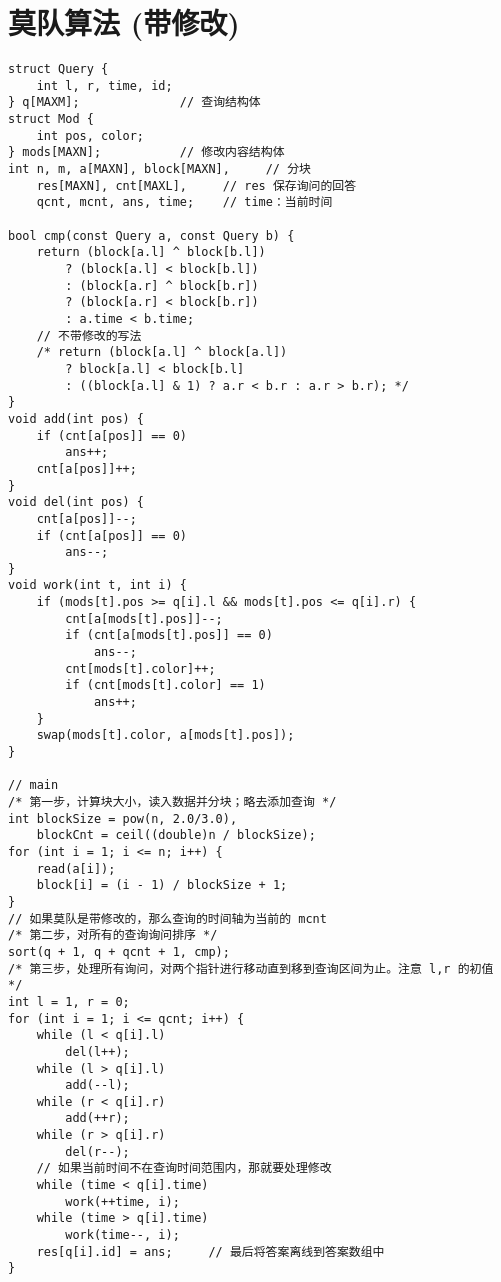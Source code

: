 \section{莫队算法 (带修改)}
\begin{verbatim}
struct Query {
    int l, r, time, id;
} q[MAXM];              // 查询结构体
struct Mod {
    int pos, color;
} mods[MAXN];           // 修改内容结构体
int n, m, a[MAXN], block[MAXN],     // 分块
    res[MAXN], cnt[MAXL],     // res 保存询问的回答
    qcnt, mcnt, ans, time;    // time：当前时间

bool cmp(const Query a, const Query b) {
    return (block[a.l] ^ block[b.l])
        ? (block[a.l] < block[b.l])
        : (block[a.r] ^ block[b.r])
        ? (block[a.r] < block[b.r])
        : a.time < b.time;
    // 不带修改的写法
    /* return (block[a.l] ^ block[a.l])
        ? block[a.l] < block[b.l]
        : ((block[a.l] & 1) ? a.r < b.r : a.r > b.r); */    
}
void add(int pos) {
    if (cnt[a[pos]] == 0)
        ans++;
    cnt[a[pos]]++;
}
void del(int pos) {
    cnt[a[pos]]--;
    if (cnt[a[pos]] == 0)
        ans--;
}
void work(int t, int i) {
    if (mods[t].pos >= q[i].l && mods[t].pos <= q[i].r) {
        cnt[a[mods[t].pos]]--;
        if (cnt[a[mods[t].pos]] == 0)
            ans--;
        cnt[mods[t].color]++;
        if (cnt[mods[t].color] == 1)
            ans++;
    }
    swap(mods[t].color, a[mods[t].pos]);
}

// main
/* 第一步，计算块大小，读入数据并分块；略去添加查询 */
int blockSize = pow(n, 2.0/3.0),
    blockCnt = ceil((double)n / blockSize);
for (int i = 1; i <= n; i++) {
    read(a[i]);
    block[i] = (i - 1) / blockSize + 1;
}
// 如果莫队是带修改的，那么查询的时间轴为当前的 mcnt
/* 第二步，对所有的查询询问排序 */
sort(q + 1, q + qcnt + 1, cmp);
/* 第三步，处理所有询问，对两个指针进行移动直到移到查询区间为止。注意 l,r 的初值 */
int l = 1, r = 0;
for (int i = 1; i <= qcnt; i++) {
    while (l < q[i].l)
        del(l++);
    while (l > q[i].l)
        add(--l);
    while (r < q[i].r)
        add(++r);
    while (r > q[i].r)
        del(r--);
    // 如果当前时间不在查询时间范围内，那就要处理修改
    while (time < q[i].time)
        work(++time, i);
    while (time > q[i].time)
        work(time--, i);
    res[q[i].id] = ans;     // 最后将答案离线到答案数组中
}
\end{verbatim}